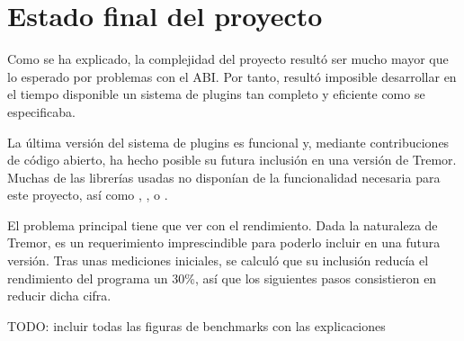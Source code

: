 \section{Estado final del proyecto}

Como se ha explicado, la complejidad del proyecto resultó ser mucho mayor que lo
esperado por problemas con el ABI. Por tanto, resultó imposible desarrollar en
el tiempo disponible un sistema de plugins tan completo y eficiente como se
especificaba.

La última versión del sistema de plugins es funcional y, mediante contribuciones
de código abierto, ha hecho posible su futura inclusión en una versión de
Tremor. Muchas de las librerías usadas no disponían de la funcionalidad
necesaria para este proyecto, así como , ,
 o .

El problema principal tiene que ver con el rendimiento. Dada la naturaleza de
Tremor, es un requerimiento imprescindible para poderlo incluir en una futura
versión. Tras unas mediciones iniciales, se calculó que su inclusión reducía el
rendimiento del programa un 30\%, así que los siguientes pasos consistieron en
reducir dicha cifra.

TODO: incluir todas las figuras de benchmarks con las explicaciones
